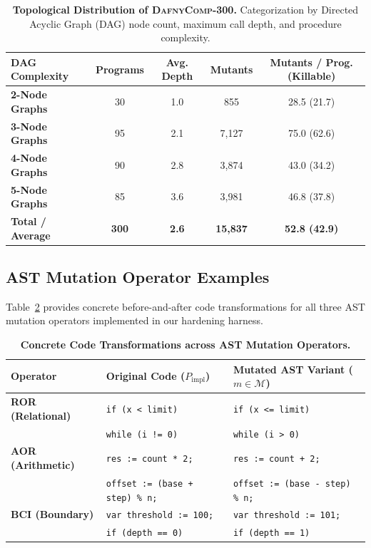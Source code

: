 \documentclass{article}
\begin{document}
\begin{table}[h]
\centering
\caption{\textbf{Topological Distribution of \textsc{DafnyComp-300}.} Categorization by Directed Acyclic Graph (DAG) node count, maximum call depth, and procedure complexity.}
\label{tab:dag_breakdown}
\setlength{\tabcolsep}{6pt}
\begin{tabular}{lcccc}
\toprule
\textbf{DAG Complexity} & \textbf{Programs} & \textbf{Avg. Depth} & \textbf{Mutants} & \textbf{Mutants / Prog. (Killable)} \\
\midrule
\textbf{2-Node Graphs} & 30 & 1.0 & 855 & 28.5 (21.7) \\
\textbf{3-Node Graphs} & 95 & 2.1 & 7,127 & 75.0 (62.6) \\
\textbf{4-Node Graphs} & 90 & 2.8 & 3,874 & 43.0 (34.2) \\
\textbf{5-Node Graphs} & 85 & 3.6 & 3,981 & 46.8 (37.8) \\
\midrule
\textbf{Total / Average} & \textbf{300} & \textbf{2.6} & \textbf{15,837} & \textbf{52.8 (42.9)} \\
\bottomrule
\end{tabular}
\end{table}

\subsection{AST Mutation Operator Examples}

Table~\ref{tab:mutation_examples} provides concrete before-and-after code transformations for all three AST mutation operators implemented in our hardening harness.

\begin{table}[h]
\centering
\caption{\textbf{Concrete Code Transformations across AST Mutation Operators.}}
\label{tab:mutation_examples}
\setlength{\tabcolsep}{4pt}
\begin{tabular}{lll}
\toprule
\textbf{Operator} & \textbf{Original Code ($P_{\text{impl}}$)} & \textbf{Mutated AST Variant ($m \in \mathcal{M}$)} \\
\midrule
\textbf{ROR (Relational)} & \texttt{if (x < limit)} & \texttt{if (x <= limit)} \\
& \texttt{while (i != 0)} & \texttt{while (i > 0)} \\
\midrule
\textbf{AOR (Arithmetic)} & \texttt{res := count * 2;} & \texttt{res := count + 2;} \\
& \texttt{offset := (base + step) \% n;} & \texttt{offset := (base - step) \% n;} \\
\midrule
\textbf{BCI (Boundary)} & \texttt{var threshold := 100;} & \texttt{var threshold := 101;} \\
& \texttt{if (depth == 0)} & \texttt{if (depth == 1)} \\
\bottomrule
\end{tabular}
\end{table}
\end{document}
